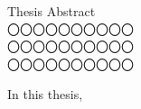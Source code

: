 \newpage
\pagestyle{empty}
\begin{center}
{ Thesis Abstract} \\
\vspace{1cm}
{ 〇〇〇〇〇〇〇〇〇〇} \\
\vspace{0.1cm}
{ 〇〇〇〇〇〇〇〇〇〇} \\
\vspace{0.1cm}
{ 〇〇〇〇〇〇〇〇〇〇} \\
\end{center}
\vspace{0.5cm}
{\large 
\hspace{5ex} In this thesis,
}\\
\newpage
